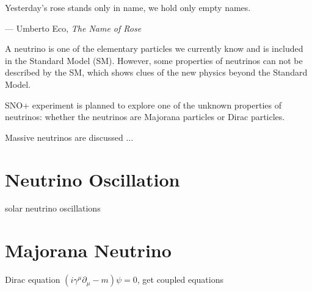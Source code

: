 \epigraph{Yesterday's rose stands only in name, we hold only empty names.}{--- \textup{Umberto Eco}, \textit{The Name of Rose}}
 

A neutrino is one of the elementary particles we currently know and is included in the Standard Model (SM). However, some properties of neutrinos can not be described by the SM, which shows clues of the new physics beyond the Standard Model.

SNO+ experiment is planned to explore one of the unknown properties of neutrinos: whether the neutrinos are Majorana particles or Dirac particles.




Massive neutrinos are discussed ...
\section{Neutrino Oscillation}


solar neutrino oscillations

\section{Majorana Neutrino}

Dirac equation $(i\gamma^\mu\partial_\mu-m)\psi=0$,
get coupled equations